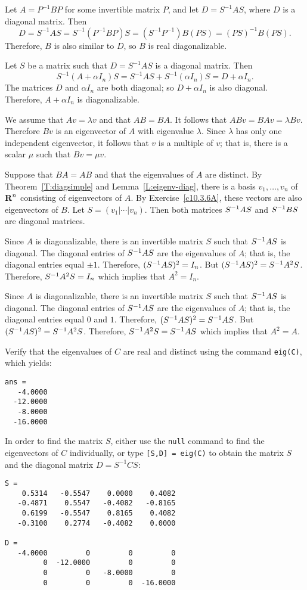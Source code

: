 \documentclass{ximera}
\begin{document}
Let $A = P^{-1}BP$ for some invertible matrix $P$, and let
$D = S^{-1}AS$, where $D$ is a diagonal matrix.  Then
\[
D = S^{-1}AS = S^{-1}(P^{-1}BP)S = (S^{-1}P^{-1})B(PS) = 
(PS)^{-1}B(PS).
\]
Therefore, $B$ is also similar to $D$, so $B$ is real diagonalizable.

Let $S$ be a matrix such that $D = S^{-1}AS$ is a diagonal matrix.
Then
\[
S^{-1}(A + \alpha I_n)S = S^{-1}AS + S^{-1}(\alpha I_n)S =
D + \alpha I_n.
\]
The matrices $D$ and $\alpha I_n$ are both diagonal; so $D + \alpha I_n$
is also diagonal.  Therefore, $A + \alpha I_n$ is diagonalizable.


  We assume that $Av=\lambda v$ and that $AB=BA$.  It follows that 
$ABv=BAv=\lambda Bv$.  Therefore $Bv$ is an eigenvector of $A$ with eigenvalue
$\lambda$.  Since $\lambda$ has only one independent eigenvector, it follows that 
$v$ is a multiple of $v$; that is, there is a scalar $\mu$ such that $Bv=\mu v$.

  Suppose that $BA=AB$ and that the eigenvalues of $A$ are distinct. 
By Theorem~\ref{T:diagsimple} and Lemma~\ref{L:eigenv-diag}, 
there is a basis $v_1,\ldots,v_n$ of $\mbox{$\bf{R}$}^n$ consisting of eigenvectors of $A$.  By 
Exercise~\ref{c10.3.6A}, these vectors are also eigenvectors of $B$.  Let 
$S=(v_1|\cdots|v_n)$.  Then both matrices $S^{-1} AS$ and $S^{-1} BS$ are diagonal 
matrices.

 Since $A$ is diagonalizable, there is an invertible matrix $S$ such 
that $S^{-1} AS$ is diagonal.  The diagonal entries of  $S^{-1} AS$ are the eigenvalues
of $A$; that is, the diagonal entries equal $\pm 1$.  Therefore, $(S^{-1} AS)^2=I_n$.
But $(S^{-1} AS)^2 = S^{-1} A^2 S$.   Therefore, $S^{-1} A^2 S=I_n$ which implies that
$A^2=I_n$.

  Since $A$ is diagonalizable, there is an invertible matrix $S$ such 
that $S^{-1} AS$ is diagonal.  The diagonal entries of  $S^{-1} AS$ are the eigenvalues
of $A$; that is, the diagonal entries equal $0$ and $1$.  Therefore, 
$(S^{-1} AS)^2=S^{-1} AS$.  But $(S^{-1} AS)^2 = S^{-1} A^2 S$.   Therefore, 
$S^{-1} A^2 S= S^{-1} AS$ which implies that $A^2=A$.

Verify that the eigenvalues of $C$ are real and distinct using the
\Matlab command {\tt eig(C)}, which yields:
\begin{verbatim}
ans =
   -4.0000
  -12.0000
   -8.0000
  -16.0000
\end{verbatim}
In order to find the matrix $S$, either use the {\tt null} command to
find the eigenvectors of $C$ individually, or type
{\tt [S,D] = eig(C)} to obtain the matrix $S$ and the diagonal matrix
$D = S^{-1}CS$:
\begin{verbatim}
S =
    0.5314   -0.5547    0.0000    0.4082
   -0.4871    0.5547   -0.4082   -0.8165
    0.6199   -0.5547    0.8165    0.4082
   -0.3100    0.2774   -0.4082    0.0000

D =
   -4.0000         0         0         0
         0  -12.0000         0         0
         0         0   -8.0000         0
         0         0         0  -16.0000
\end{verbatim}
\end{document}
